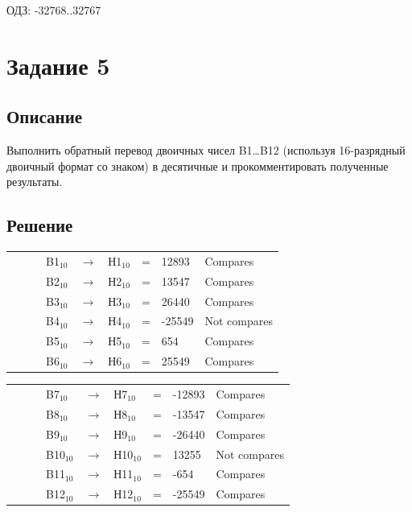 \documentclass[11pt]{article}
\begin{document}
ОДЗ: -32768..32767

\section{Задание 5}
\label{sec:org0e983b6}
\subsection{Описание}
\label{sec:orgc706981}
Выполнить обратный перевод двоичных чисел B1…B12 (используя 16-разрядный двоичный формат со знаком) в десятичные и прокомментировать полученные результаты.

\subsection{Решение}
\label{sec:org96feafe}
\setlength{\tabcolsep}{3pt}
\label{tab:org5419dcd}
\begin{tabular}{llllclcll}
 &  &  & B1\(_{\text{10}}\) & \(\to\) & Н1\(_{\text{10}}\) & = & 12893 & Compares\\
 &  &  & B2\(_{\text{10}}\) & \(\to\) & Н2\(_{\text{10}}\) & = & 13547 & Compares\\
 &  &  & B3\(_{\text{10}}\) & \(\to\) & Н3\(_{\text{10}}\) & = & 26440 & Compares\\
 &  &  & B4\(_{\text{10}}\) & \(\to\) & Н4\(_{\text{10}}\) & = & -25549 & Not compares\\
 &  &  & B5\(_{\text{10}}\) & \(\to\) & Н5\(_{\text{10}}\) & = & 654 & Compares\\
 &  &  & B6\(_{\text{10}}\) & \(\to\) & Н6\(_{\text{10}}\) & = & 25549 & Compares\\
\end{tabular}
\setlength{\tabcolsep}{3pt}
\label{tab:org10c5256}
\begin{tabular}{llllclcll}
 &  &  & B7\(_{\text{10}}\) & \(\to\) & Н7\(_{\text{10}}\) & = & -12893 & Compares\\
 &  &  & B8\(_{\text{10}}\) & \(\to\) & Н8\(_{\text{10}}\) & = & -13547 & Compares\\
 &  &  & B9\(_{\text{10}}\) & \(\to\) & Н9\(_{\text{10}}\) & = & -26440 & Compares\\
 &  &  & B10\(_{\text{10}}\) & \(\to\) & Н10\(_{\text{10}}\) & = & 13255 & Not compares\\
 &  &  & B11\(_{\text{10}}\) & \(\to\) & Н11\(_{\text{10}}\) & = & -654 & Compares\\
 &  &  & B12\(_{\text{10}}\) & \(\to\) & Н12\(_{\text{10}}\) & = & -25549 & Compares\\
\end{tabular}
\end{document}
